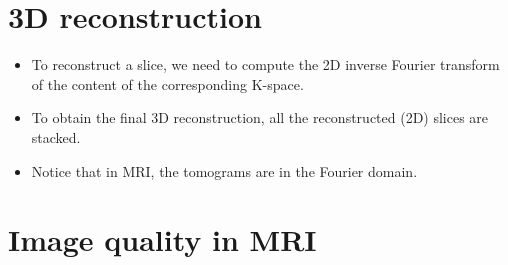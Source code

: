 \section{3D reconstruction}
\begin{itemize}
\item To reconstruct a slice, we need to compute the 2D inverse
  Fourier transform of the content of the corresponding K-space.
\item To obtain the final 3D reconstruction, all the reconstructed
  (2D) slices are stacked.
\item Notice that in MRI, the tomograms are in the Fourier domain.
\end{itemize}

\section{Image quality in \gls{MRI}}

